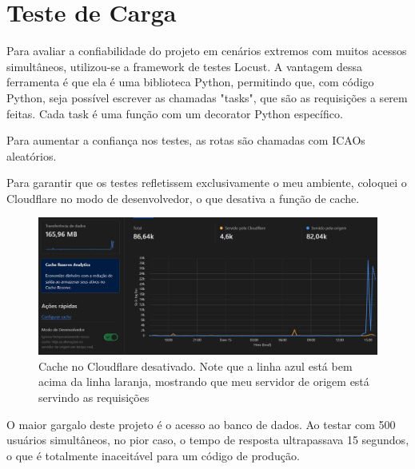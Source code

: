 \chapter{Teste de Carga}

Para avaliar a confiabilidade do projeto em cenários extremos com muitos acessos simultâneos, 
utilizou-se a framework de testes Locust. A vantagem dessa ferramenta é que ela é uma biblioteca 
Python, permitindo que, com código Python, seja possível escrever as chamadas "tasks", que são 
as requisições a serem feitas. Cada task é uma função com um decorator Python específico.

Para aumentar a confiança nos testes, as rotas são chamadas com ICAOs aleatórios.

Para garantir que os testes refletissem exclusivamente o meu ambiente, coloquei o Cloudflare no
modo de desenvolvedor, o que desativa a função de cache.

\begin{figure}[ht]
    \begin{center}
    \includegraphics[width=400pt]{img/cloudflare-dev-mode.png}
    \caption{Cache no Cloudflare desativado. Note que a linha azul está bem acima da linha laranja, 
    mostrando que meu servidor de origem está servindo as requisições}
    \label{fig:cloudflare-dev-mode}
    \end{center}
\end{figure}

O maior gargalo deste projeto é o acesso ao banco de dados. Ao testar com 500 usuários simultâneos, 
no pior caso, o tempo de resposta ultrapassava 15 segundos, o que é totalmente inaceitável para um 
código de produção.

